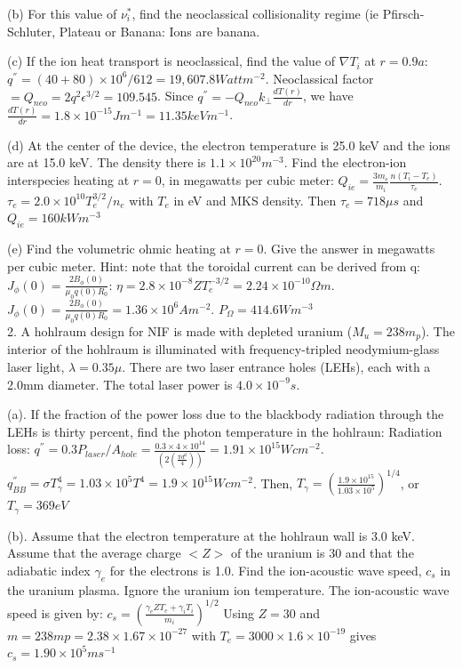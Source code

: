 \documentclass{article}
\begin{document}
\begin{multicols}{3}
 (b)  For this value of $\nu^{*}_{i}$, find the neoclassical collisionality regime (ie Pfirsch-Schluter, Plateau or Banana: Ions are banana.  
 
 (c) If the ion heat transport is neoclassical, find the value of $\nabla T_{i}$ at $r=0.9a$: $q^{''} = (40+80)\times 10^{6}/612 = 19,607.8 Watt m^{-2}$.  Neoclassical factor $ = Q_{neo} = 2q^{2}\epsilon^{3/2} = 109.545$.  Since $q^{''} = -Q_{neo}k_{\perp}\frac{dT(r)}{dr}$, we have $\frac{dT(r)}{dr} = 1.8 \times 10^{-15}Jm^{-1} = 11.35keVm^{-1}$.
 
 (d) At the center of the device, the electron temperature is 25.0 keV and the ions are at 15.0 keV. The density there is $1.1\times10^{20}m^{-3}$. Find the electron-ion interspecies heating at $r=0$, in megawatts per cubic meter: $Q_{ie} = \frac{3m_{e}}{m_{i}}\frac{n(T_{i}-T_{e})}{\tau_{e}}$.  $\tau_{e} = 2.0\times 10^{10}T_{e}^{3/2}/n_{e}$ with $T_{e}$ in eV and MKS density.  Then $\tau_{e} = 718\mu s$ and $Q_{ie} = 160 kW m^{-3}$ 
 
 (e) Find the volumetric ohmic heating at $r=0$.  Give the answer in megawatts per cubic meter.  Hint: note that the toroidal current can be derived from q: $J_{\phi}(0) = \frac{2B_{\phi}(0)}{\mu_{0} q(0)R_{0}}$: $\eta = 2.8 \times 10^{-8}ZT_{e}^{-3/2} = 2.24\times 10^{-10} \Omega m$.  $J_{\phi}(0) = \frac{2B_{\phi}(0)}{\mu_{0}q(0)R_{0}} = 1.36\times 10^{6} A m^{-2}$.  $P_{\Omega} = 414.6W m^{-3}$\\
2. A hohlraum design for NIF is made with depleted uranium ($M_{u} = 238m_{p}$).  The interior of the hohlraum is illuminated with frequency-tripled neodymium-glass laser light, $\lambda = 0.35\mu$. There are two laser entrance holes (LEHs), each with a 2.0mm diameter.  The total laser power is $4.0\times 10^{-9}s$. 

(a). If the fraction of the power loss due to the blackbody radiation through the LEHs is thirty percent, find the photon temperature in the hohlraun: Radiation loss: $q^{''} = 0.3P_{laser} /A_{hole} = \frac{0.3\times4\times10^{14}}{(2(\frac{\pi d^{2}}{4	}))} = 1.91 \times 10^{15}Wcm^{-2}$. 
$q^{''}_{BB} = \sigma T_{\gamma}^{4} = 1.03 \times 10^{5}T^{4} = 1.9\times 10^{15} W cm^{-2}$.  Then, $T_{\gamma} =  (\frac{1.9\times 10^{15}}{1.03\times 10^{5}})^{1/4}$, or $T_{\gamma} = 369 eV$

(b). Assume that the electron temperature at the hohlraun wall is 3.0 keV.  Assume that the average charge $<Z>$ of the uranium is 30 and that the adiabatic index $\gamma_{e}$ for the electrons is 1.0.  Find the ion-acoustic wave speed, $c_{s}$ in the uranium plasma.  Ignore the uranium ion temperature.
The ion-acoustic wave speed is given by: 
$c_{s} = (\frac{\gamma_{e}ZT_{e} + \gamma_{i}T_{i}}{m_{i}})^{1/2}$
Using $Z=30$ and $m=238mp= 2.38 \times 1.67 \times 10^{-27}$ with $T_{e} = 3000 \times 1.6 \times 10^{-19}$ gives $c_{s} = 1.90\times 10^{5}ms^{-1}$


\end{multicols}
\end{document}
